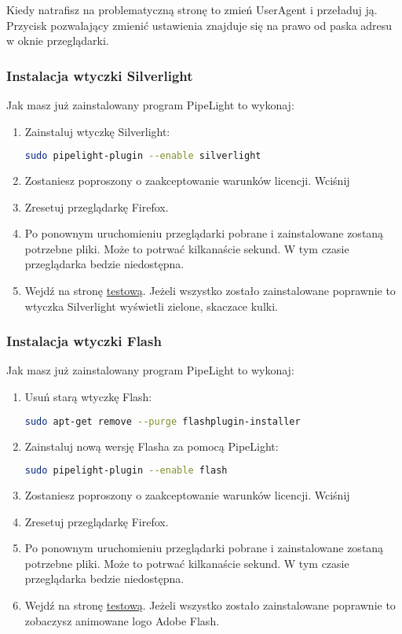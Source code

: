 Kiedy natrafisz na problematyczną stronę to zmień UserAgent i przeładuj ją. Przycisk pozwalający zmienić ustawienia znajduje się na prawo od paska adresu w oknie przeglądarki.

\subsubsection{Instalacja wtyczki Silverlight}
\noindent Jak masz już zainstalowany program PipeLight to wykonaj:
\begin{enumerate}
\item Zainstaluj wtyczkę Silverlight:
\begin{lstlisting}[language=bash]
sudo pipelight-plugin --enable silverlight
\end{lstlisting}
\item Zostaniesz poproszony o zaakceptowanie warunków licencji. Wciśnij 
\item Zresetuj przeglądarkę Firefox.
\item Po ponownym uruchomieniu przeglądarki pobrane i zainstalowane zostaną potrzebne pliki. Może to potrwać kilkanaście sekund. W tym czasie przeglądarka bedzie niedostępna.
\item Wejdź na stronę \href{http://bubblemark.com/silverlight2.html}{testową}. Jeżeli wszystko zostało zainstalowane poprawnie to wtyczka Silverlight wyświetli zielone, skaczace kulki.
\end{enumerate}

\subsubsection{Instalacja wtyczki Flash}
\noindent Jak masz już zainstalowany program PipeLight to wykonaj:
\begin{enumerate}
\item Usuń starą wtyczkę Flash:
\begin{lstlisting}[language=bash]
sudo apt-get remove --purge flashplugin-installer
\end{lstlisting}
\item Zainstaluj nową wersję Flasha za pomocą PipeLight:
\begin{lstlisting}[language=bash]
sudo pipelight-plugin --enable flash
\end{lstlisting}
\item Zostaniesz poproszony o zaakceptowanie warunków licencji. Wciśnij 
\item Zresetuj przeglądarkę Firefox.
\item Po ponownym uruchomieniu przeglądarki pobrane i zainstalowane zostaną potrzebne pliki. Może to potrwać kilkanaście sekund. W tym czasie przeglądarka bedzie niedostępna.
\item Wejdź na stronę \href{https://www.adobe.com/software/flash/about/}{testową}. Jeżeli wszystko zostało zainstalowane poprawnie to zobaczysz animowane logo Adobe Flash.
\end{enumerate}

